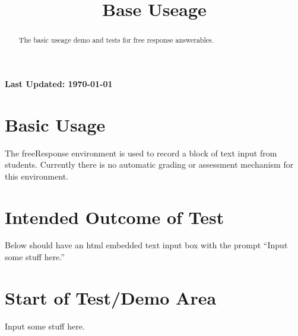 \documentclass{ximera}
\title{Base Useage}
\begin{document}
\begin{abstract}
    The basic useage demo and tests for free response answerables.
\end{abstract}
\maketitle

{{\Huge \bfseries Last Updated: \today}} \\


\section{Basic Usage}
The freeResponse environment is used to record a block of text input from students. 
Currently there is no automatic grading or assessment mechanism for this environment.

\section{Intended Outcome of Test}
Below should have an html embedded text input box with the prompt ``Input some stuff here.''

\section{Start of Test/Demo Area}
\begin{freeResponse}
    Input some stuff here.
\end{freeResponse}

\hrulefill
\end{document}
